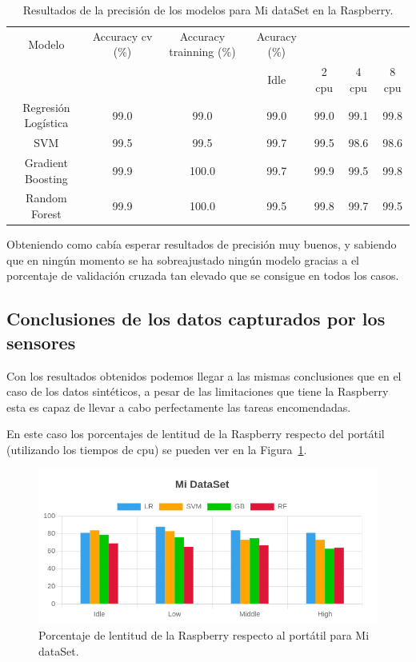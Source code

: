 \documentclass[a4paper, 12pt]{book}
\begin{document}
\begin{table}[]
\begin{adjustbox}{width=\textwidth}
\centering
    \begin{tabular}{c  c  c  c  c  c  c}
    \hline
    Modelo & Accuracy cv (\%) & Accuracy trainning (\%) & Acuracy (\%) & & & \\
    \cline{4-7}
     &  &   &  Idle & 2 cpu & 4 cpu & 8 cpu \\
     \hline
     Regresión Logística & 99.0 & 99.0 & 99.0 & 99.0 & 99.1 & 99.8\\
     SVM & 99.5 & 99.5 & 99.7 & 99.5 & 98.6 & 98.6\\
     Gradient Boosting & 99.9 & 100.0 & 99.7 & 99.9 & 99.5 & 99.8\\
     Random Forest & 99.9 & 100.0 & 99.5 & 99.8 & 99.7 & 99.5\\
    \hline
    \end{tabular}
\end{adjustbox}
\caption{Resultados de la precisión de los modelos para Mi dataSet en la Raspberry.}
\label{tab:acc_senspc}
\end{table}

Obteniendo como cabía esperar resultados de precisión muy buenos, y sabiendo que en ningún momento se ha sobreajustado ningún modelo gracias a el porcentaje de validación cruzada tan elevado que se consigue en todos los casos.

\subsection{Conclusiones de los datos capturados por los sensores}
\label{subsec:conclusiones_sensados}

Con los resultados obtenidos podemos llegar a las mismas conclusiones que en el caso de los datos sintéticos, a pesar de las limitaciones que tiene la Raspberry esta es capaz de llevar a cabo perfectamente las tareas encomendadas.

En este caso los porcentajes de lentitud de la Raspberry respecto del portátil (utilizando los tiempos de cpu) se pueden ver en la Figura~\ref{fig:per_Mi}.

\begin{figure}[]
  \centering
  \includegraphics[width=14cm, keepaspectratio]{img/per_mi.png}
  \caption{Porcentaje de lentitud de la Raspberry respecto al portátil para Mi dataSet.}
  \label{fig:per_Mi}
\end{figure}
\end{document}
